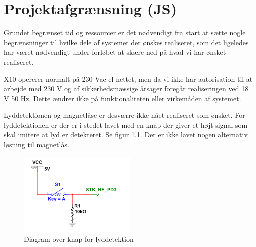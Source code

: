 \chapter{Projektafgrænsning (JS)}

Grundet begrænset tid og ressourcer er det nødvendigt fra start at sætte nogle begrænsninger til hvilke dele af systemet der ønskes realiseret, som det ligeledes har været nødvendigt under forløbet at skære ned på hvad vi har ønsket realiseret. 

X10 opererer normalt på 230 Vac el-nettet, men da vi ikke har autorisation til at arbejde med 230 V og af sikkerhedsmæssige årsager foregår realiseringen ved 18 V 50 Hz. Dette ændrer ikke på funktionaliteten eller virkemåden af systemet. 

Lyddetektionen og magnetlåse er desværre ikke nået realiseret som ønsket.
For lyddetektionen er der er i stedet lavet med en knap der giver et højt signal som skal imitere at lyd er detekteret. Se figur \ref{fig:BABY_ALARM}. 
Der er ikke lavet nogen alternativ løsning til magnetlås.

\begin{figure}[htbp]
  \centering
    \includegraphics[width=0.5\textwidth]{billeder/BABY_SWITCH}
    \caption{Diagram over knap for lyddetektion}
    \label{fig:BABY_ALARM}
\end{figure}

